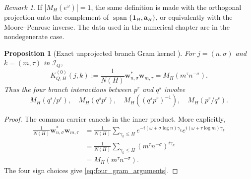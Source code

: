 \documentclass[11pt]{amsart}
\numberwithin{equation}{section}
\theoremstyle{plain}
\newtheorem{proposition}[theorem]{Proposition}
\theoremstyle{definition}
\theoremstyle{remark}
\newtheorem{remark}[theorem]{Remark}
\newcommand{\1}{\mathbf{1}}
\begin{document}
\begin{remark}
\label{rem:degenerate_joint_projection}
If $|M_H(e^\omega)|=1$, the same definition is made with the orthogonal
projection onto the complement of
$\operatorname{span}\{\mathbf 1_H,\mathbf a_H\}$, or equivalently with
the Moore--Penrose inverse.  The data used in the numerical chapter are in
the nondegenerate case.
\end{remark}


\begin{proposition}[Exact unprojected branch Gram kernel {}]
\label{prop:unprojected_gram}
For $j=(n,\sigma)$ and $k=(m,\tau)$ in $\mathcal I_Q$,
\begin{equation}
K^{(0)}_{Q,H}(j,k)
:=
\frac1{N(H)}\mathbf w_{n,\sigma}^\ast\mathbf w_{m,\tau}
=
M_H(m^\tau n^{-\sigma}).
\label{eq:unprojected_gram}
\end{equation}
Thus the four branch interactions between $p^r$ and $q^s$ involve
\begin{equation}
M_H(q^s/p^r),
\quad
M_H(q^sp^r),
\quad
M_H((q^sp^r)^{-1}),
\quad
M_H(p^r/q^s).
\label{eq:four_gram_arguments}
\end{equation}
\end{proposition}

\begin{proof}
The common carrier cancels in the inner product.  More explicitly,
\begin{align}
\frac1{N(H)}\mathbf w_{n,\sigma}^\ast\mathbf w_{m,\tau}
&=
\frac1{N(H)}
\sum_{\gamma_k\leq H}
 e^{-i(\omega+\sigma\log n)\gamma_k}
 e^{ i(\omega+\tau\log m)\gamma_k}
\label{eq:branch_gram_expansion}
\\
&=
\frac1{N(H)}
\sum_{\gamma_k\leq H}
(m^\tau n^{-\sigma})^{i\gamma_k}
\label{eq:branch_gram_kernel_step}
\\
&=
M_H(m^\tau n^{-\sigma}).
\label{eq:branch_gram_kernel_result}
\end{align}
The four sign choices give \eqref{eq:four_gram_arguments}.
\end{proof}
\end{document}
